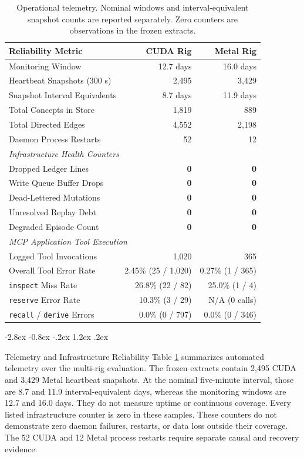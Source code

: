 \documentclass[10pt,twocolumn]{article}
\makeatletter
\renewcommand\subsection{\@startsection{subsection}{2}{\z@}%
  {-2.8ex \@plus -0.8ex \@minus -.2ex}%
  {1.2ex \@plus .2ex}%
  {\normalfont\normalsize\bfseries\raggedright}}
\makeatother
\begin{document}
\begin{table}[t]
\centering
\caption{Operational telemetry. Nominal windows and interval-equivalent snapshot counts are reported separately. Zero counters are observations in the frozen extracts.}
\label{tab:reliability}
\scriptsize
\begin{tabular*}{\columnwidth}{@{\extracolsep{\fill}}lrr@{}}
\toprule
\textbf{Reliability Metric} & \textbf{CUDA Rig} & \textbf{Metal Rig} \\
\midrule
Monitoring Window & 12.7 days & 16.0 days \\
Heartbeat Snapshots (300 s) & 2,495 & 3,429 \\
Snapshot Interval Equivalents & 8.7 days & 11.9 days \\
Total Concepts in Store & 1,819 & 889 \\
Total Directed Edges & 4,552 & 2,198 \\
Daemon Process Restarts & 52 & 12 \\
\midrule
\multicolumn{3}{l}{\textit{Infrastructure Health Counters}} \\
Dropped Ledger Lines & \textbf{0} & \textbf{0} \\
Write Queue Buffer Drops & \textbf{0} & \textbf{0} \\
Dead-Lettered Mutations & \textbf{0} & \textbf{0} \\
Unresolved Replay Debt & \textbf{0} & \textbf{0} \\
Degraded Episode Count & \textbf{0} & \textbf{0} \\
\midrule
\multicolumn{3}{l}{\textit{MCP Application Tool Execution}} \\
Logged Tool Invocations & 1,020 & 365 \\
Overall Tool Error Rate & 2.45\% (25 / 1,020) & 0.27\% (1 / 365) \\
\texttt{inspect} Miss Rate & 26.8\% (22 / 82) & 25.0\% (1 / 4) \\
\texttt{reserve} Error Rate & 10.3\% (3 / 29) & N/A (0 calls) \\
\texttt{recall} / \texttt{derive} Errors & 0.0\% (0 / 797) & 0.0\% (0 / 346) \\
\bottomrule
\end{tabular*}
\end{table}

\subsection{Telemetry and Infrastructure Reliability}
Table \ref{tab:reliability} summarizes automated telemetry over the multi-rig evaluation.
The frozen extracts contain 2,495 CUDA and 3,429 Metal heartbeat snapshots. At the nominal five-minute interval, those are 8.7 and 11.9 interval-equivalent days, whereas the monitoring windows are 12.7 and 16.0 days. They do not measure uptime or continuous coverage.
Every listed infrastructure counter is zero in these samples. These counters do not demonstrate zero daemon failures, restarts, or data loss outside their coverage. The 52 CUDA and 12 Metal process restarts require separate causal and recovery evidence.
\end{document}
